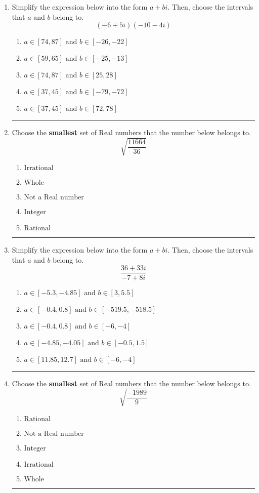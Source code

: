 \documentclass[14pt]{extbook}
\newcommand{\litem}[1]{\item#1\hspace*{-1cm}\rule{\textwidth}{0.4pt}}
\begin{document}
\begin{enumerate}
{\begin{enumerate}[label=\Alph*.]
\end{enumerate} }
\litem{
Simplify the expression below into the form $a+bi$. Then, choose the intervals that $a$ and $b$ belong to.\[ (-6 + 5 i)(-10 - 4 i) \]\begin{enumerate}[label=\Alph*.]
\item \( a \in [74, 87] \text{ and } b \in [-26, -22] \)
\item \( a \in [59, 65] \text{ and } b \in [-25, -13] \)
\item \( a \in [74, 87] \text{ and } b \in [25, 28] \)
\item \( a \in [37, 45] \text{ and } b \in [-79, -72] \)
\item \( a \in [37, 45] \text{ and } b \in [72, 78] \)

\end{enumerate} }
\litem{
Choose the \textbf{smallest} set of Real numbers that the number below belongs to.\[ \sqrt{\frac{11664}{36}} \]\begin{enumerate}[label=\Alph*.]
\item \( \text{Irrational} \)
\item \( \text{Whole} \)
\item \( \text{Not a Real number} \)
\item \( \text{Integer} \)
\item \( \text{Rational} \)

\end{enumerate} }
\litem{
Simplify the expression below into the form $a+bi$. Then, choose the intervals that $a$ and $b$ belong to.\[ \frac{36 + 33 i}{-7 + 8 i} \]\begin{enumerate}[label=\Alph*.]
\item \( a \in [-5.3, -4.85] \text{ and } b \in [3, 5.5] \)
\item \( a \in [-0.4, 0.8] \text{ and } b \in [-519.5, -518.5] \)
\item \( a \in [-0.4, 0.8] \text{ and } b \in [-6, -4] \)
\item \( a \in [-4.85, -4.05] \text{ and } b \in [-0.5, 1.5] \)
\item \( a \in [11.85, 12.7] \text{ and } b \in [-6, -4] \)

\end{enumerate} }
\litem{
Choose the \textbf{smallest} set of Real numbers that the number below belongs to.\[ \sqrt{\frac{-1989}{9}} \]\begin{enumerate}[label=\Alph*.]
\item \( \text{Rational} \)
\item \( \text{Not a Real number} \)
\item \( \text{Integer} \)
\item \( \text{Irrational} \)
\item \( \text{Whole} \)


\end{enumerate}}
\end{enumerate}
\end{document}
